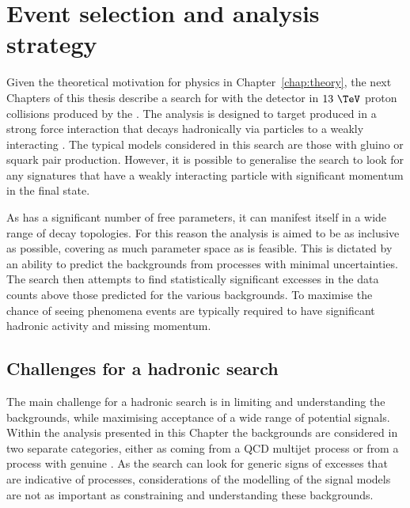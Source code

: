 \chapter{Event selection and analysis strategy} %
\label{chap:selection}

Given the theoretical motivation for \BSM physics in
Chapter~\ref{chap:theory}, the next Chapters of this thesis describe a
search for \SUSY with the \CMS detector in $13~\tev$ proton collisions
produced by the \LHC. The analysis is designed to target \SUSY
produced in a strong force interaction that decays hadronically via
\SM particles to a weakly interacting \LSP. The typical \SUSY models
considered in this search are those with gluino or squark pair
production. However, it is possible to generalise the search to look
for any \BSM signatures that have a weakly interacting particle with
significant momentum in the final state.

As \SUSY has a significant number of free parameters, it can manifest
itself in a wide range of decay topologies. For this reason the
analysis is aimed to be as inclusive as possible, covering as much
parameter space as is feasible.  This is dictated by an ability to
predict the backgrounds from \SM processes with minimal uncertainties.
The search then attempts to find statistically significant excesses in
the data counts above those predicted for the various backgrounds. To
maximise the chance of seeing \BSM phenomena events are typically
required to have significant hadronic activity and missing momentum.  

\section{Challenges for a hadronic \BSM search}
\label{sec:challenge}

The main challenge for a hadronic \BSM search is in limiting and
understanding the backgrounds, while maximising acceptance of a wide
range of potential \BSM signals. Within the analysis presented in this
Chapter the backgrounds are considered in two separate categories,
either as coming from a QCD multijet process or from a \SM process
with genuine \MET. As the search can look for generic signs of
excesses that are indicative of \BSM processes, considerations of the
modelling of the signal models are not as important as constraining
and understanding these backgrounds.

